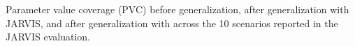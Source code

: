 \begin{table}[tb]
  \caption{Parameter value coverage (PVC) before generalization, after generalization with JARVIS, and after generalization with \ToolTeralizer{} across the 10 scenarios reported in the JARVIS evaluation.}
  \label{tab:jarvis-scenario-pvc}
  \centering
  
\end{table}
